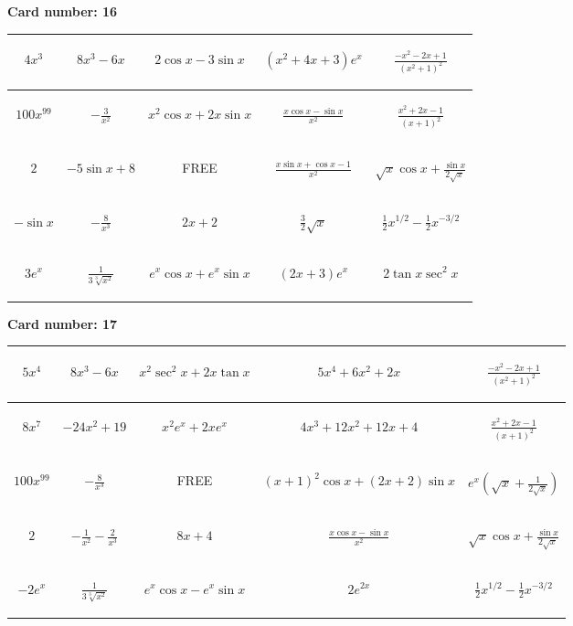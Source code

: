 \documentclass{article}
\newcommand{\entry}[1]{\begin{minipage}[t][2.75cm][t]{4cm} \vspace{1cm} \begin{center}#1\end{center} \end{minipage}}
\newcommand{\freespace}{\entry{FREE}}
\newcommand{\cardnumber}[1]{\noindent \textbf{Card number: #1} \bigskip}
\begin{document}
\pagebreak

\cardnumber{16}
\begin{center}
\begin{tabular}{|*{5}{c|}}
    \hline
    \entry{$4x^3$} & \entry{$8x^3 - 6x$} & \entry{$2 \cos x - 3 \sin x$} & \entry{$(x^2 + 4x + 3) e^x$} & \entry{$\frac{-x^2 - 2x + 1}{(x^2 + 1)^2}$} \\ \hline
    \entry{$100x^{99}$} & \entry{$-\frac{3}{x^2}$} & \entry{$x^2 \cos x + 2x \sin x$} & \entry{$\frac{x \cos x - \sin x}{x^2}$} & \entry{$\frac{x^2 + 2x - 1}{(x + 1)^2}$} \\ \hline
    \entry{$2$} & \entry{$-5 \sin x + 8$} & \freespace & \entry{$\frac{x \sin x + \cos x - 1}{x^2}$} & \entry{$\sqrt{x} \cos x + \frac{\sin x}{2 \sqrt{x}}$} \\ \hline
    \entry{$-\sin x$} & \entry{$-\frac{8}{x^3}$} & \entry{$2x + 2$} & \entry{$\frac{3}{2} \sqrt{x}$} & \entry{$\frac{1}{2} x^{1/2} - \frac{1}{2} x^{-3/2}$} \\ \hline
    \entry{$3e^x$} & \entry{$\frac{1}{3\sqrt[3]{x^2}}$} & \entry{$e^x \cos x + e^x \sin x$} & \entry{$(2x + 3) e^x$} & \entry{$2 \tan x \sec^2 x$} \\ \hline
\end{tabular}
\end{center}

\pagebreak

\cardnumber{17}
\begin{center}
\begin{tabular}{|*{5}{c|}}
    \hline
    \entry{$5x^4$} & \entry{$8x^3 - 6x$} & \entry{$x^2 \sec^2 x + 2x \tan x$} & \entry{$5x^4 + 6x^2 + 2x$} & \entry{$\frac{-x^2 - 2x + 1}{(x^2 + 1)^2}$} \\ \hline
    \entry{$8x^7$} & \entry{$-24x^2 + 19$} & \entry{$x^2 e^x + 2x e^x$} & \entry{$4x^3 + 12x^2 + 12x + 4$} & \entry{$\frac{x^2 + 2x - 1}{(x + 1)^2}$} \\ \hline
    \entry{$100x^{99}$} & \entry{$-\frac{8}{x^3}$} & \freespace & \entry{$(x + 1)^2 \cos x + (2x + 2) \sin x$} & \entry{$e^x \left(\sqrt{x} + \frac{1}{2\sqrt{x}}\right)$} \\ \hline
    \entry{$2$} & \entry{$-\frac{1}{x^2} - \frac{2}{x^3}$} & \entry{$8x + 4$} & \entry{$\frac{x \cos x - \sin x}{x^2}$} & \entry{$\sqrt{x} \cos x + \frac{\sin x}{2 \sqrt{x}}$} \\ \hline
    \entry{$-2e^x$} & \entry{$\frac{1}{3\sqrt[3]{x^2}}$} & \entry{$e^x \cos x - e^x \sin x$} & \entry{$2e^{2x}$} & \entry{$\frac{1}{2} x^{1/2} - \frac{1}{2} x^{-3/2}$} \\ \hline
\end{tabular}
\end{center}
\end{document}
